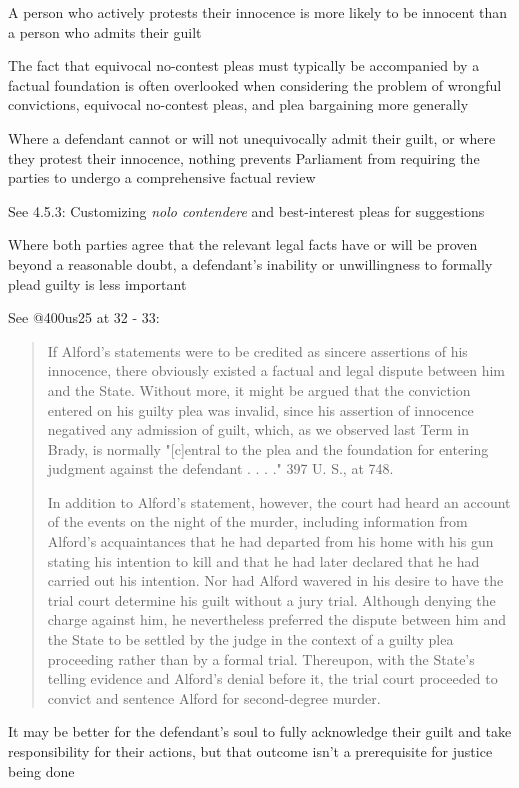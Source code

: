 A person who actively protests their innocence is more likely to be innocent than a person who admits their guilt

The fact that equivocal no-contest pleas must typically be accompanied by a factual foundation is often overlooked when considering the problem of wrongful convictions, equivocal no-contest pleas, and plea bargaining more generally

Where a defendant cannot or will not unequivocally admit their guilt, or where they protest their innocence, nothing prevents Parliament from requiring the parties to undergo a comprehensive factual review

See 4.5.3: Customizing \textit{nolo contendere} and best-interest pleas for suggestions

Where both parties agree that the relevant legal facts have or will be proven beyond a reasonable doubt, a defendant's inability or unwillingness to formally plead guilty is less important

See @400us25 at 32 - 33:
\begin{quote}
    If Alford's statements were to be credited as sincere assertions of his innocence, there obviously existed a factual and legal dispute between him and the State. Without more, it might be argued that the conviction entered on his guilty plea was invalid, since his assertion of innocence negatived any admission of guilt, which, as we observed last Term in Brady, is normally "[c]entral to the plea and the foundation for entering judgment against the defendant . . . ." 397 U. S., at 748.
    
    In addition to Alford's statement, however, the court had heard an account of the events on the night of the murder, including information from Alford's acquaintances that he had departed from his home with his gun stating his intention to kill and that he had later declared that he had carried out his intention. Nor had Alford wavered in his desire to have the trial court determine his guilt without a jury trial. Although denying the charge against him, he nevertheless preferred the dispute between him and the State to be settled by the judge in the context of a guilty plea proceeding rather than by a formal trial. Thereupon, with the State's telling evidence and Alford's denial before it, the trial court proceeded to convict and sentence Alford for second-degree murder.
\end{quote}

It may be better for the defendant's soul to fully acknowledge their guilt and take responsibility for their actions, but that outcome isn't a prerequisite for justice being done

